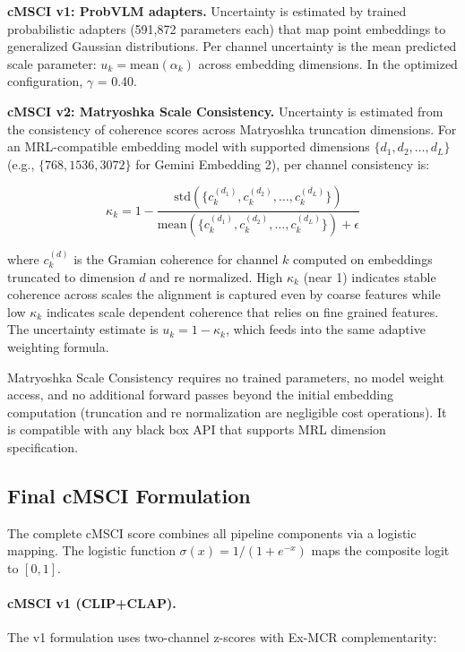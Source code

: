 \documentclass[a4paper,fleqn]{cas-sc}
\begin{document}
\begin{itemize}
\textbf{cMSCI v1: ProbVLM adapters.} Uncertainty is estimated by trained probabilistic adapters (591,872 parameters each) that map point embeddings to generalized Gaussian distributions. Per channel uncertainty is the mean predicted scale parameter: $u_k = \mathrm{mean}(\alpha_k)$ across embedding dimensions. In the optimized configuration, $\gamma$ = 0.40.

\textbf{cMSCI v2: Matryoshka Scale Consistency.} Uncertainty is estimated from the consistency of coherence scores across Matryoshka truncation dimensions. For an MRL-compatible embedding model with supported dimensions $\{d_1, d_2, \ldots, d_L\}$ (e.g., $\{768, 1536, 3072\}$ for Gemini Embedding 2), per channel consistency is:

\begin{equation}\label{eq:matryoshka-consistency}
\kappa_k = 1 - \frac{\mathrm{std}(\{c_k^{(d_1)}, c_k^{(d_2)}, \ldots, c_k^{(d_L)}\})}{\mathrm{mean}(\{c_k^{(d_1)}, c_k^{(d_2)}, \ldots, c_k^{(d_L)}\}) + \epsilon}
\end{equation}

where $c_k^{(d)}$ is the Gramian coherence for channel $k$ computed on embeddings truncated to dimension $d$ and re normalized. High $\kappa_k$ (near 1) indicates stable coherence across scales the alignment is captured even by coarse features while low $\kappa_k$ indicates scale dependent coherence that relies on fine grained features. The uncertainty estimate is $u_k = 1 - \kappa_k$, which feeds into the same adaptive weighting formula.

Matryoshka Scale Consistency requires no trained parameters, no model weight access, and no additional forward passes beyond the initial embedding computation (truncation and re normalization are negligible cost operations). It is compatible with any black box API that supports MRL dimension specification.



\subsection{Final cMSCI Formulation}\label{sec:final-formulation}

The complete cMSCI score combines all pipeline components via a logistic mapping. The logistic function $\sigma(x) = 1/(1 + e^{-x})$ maps the composite logit to $[0, 1]$.

\paragraph{cMSCI v1 (CLIP+CLAP).} The v1 formulation uses two-channel z-scores with Ex-MCR complementarity:


\end{itemize}
\end{document}
